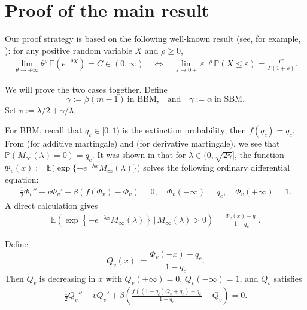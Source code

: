 \documentclass[11pt]{article}
\numberwithin{equation}{section}
\begin{document}
\section{Proof of the main result}

Our proof strategy is based on the following well-known result (see, for example, \cite[Theorem 1.7.1', p.~38]{BGT}): for any positive random variable $X$ and $\rho \geq 0$,
\begin{align}\label{Lap-small}
	\lim_{\theta \to +\infty} \theta^\rho \, \mathbb{E}(e^{-\theta X}) = C \in (0, \infty) 
	\quad \Longleftrightarrow \quad
	\lim_{\varepsilon \to 0+} \varepsilon^{-\rho} \, \mathbb{P}(X \leq \varepsilon) = \frac{C}{\Gamma(1+\rho)}.
\end{align}

We will prove the two cases together. Define
\[
\gamma:= \beta(m-1)\ \mbox{in BBM,} \quad \mbox{and}\quad 
\gamma := \alpha\ \mbox{in SBM}.
\]
Set $v := \lambda/2 + \gamma/\lambda$. 

For BBM, 
recall that $q_c \in [0,1)$ is
the extinction probability; then $f(q_c) = q_c$. From \cite[Theorem 1.2]{BK1997} (for additive martingale) and \cite[Proposition A.3(iii)]{Aidekon} (for derivative martingale), we see that $\mathbb{P}(M_\infty(\lambda) = 0) = q_c$.  
It was shown in \cite{K04}  that for $\lambda \in (0, \sqrt{2\gamma}]$, the function $\Phi_v(x) := \mathbb{E}\bigl(\exp\{-e^{-\lambda x} M_\infty(\lambda)\}\bigr)$ solves the following ordinary differential equation:
\begin{align*}
	\frac{1}{2}\Phi_v'' + v \Phi_v' + \beta(f(\Phi_v) - \Phi_v) = 0
, \quad  \Phi_v(-\infty)=q_c,\quad \Phi_v(+\infty)=1.
\end{align*}
A direct calculation gives
\begin{align}\label{Laplace-BBM}
	\mathbb{E}\left(\exp\left\{-e^{-\lambda x} M_\infty(\lambda)\right\} \,\Big|\, M_\infty(\lambda) > 0\right) = \frac{\Phi_v(x) - q_c}{1 - q_c}
	.
\end{align}

Define
\[
Q_v(x) := \frac{\Phi_v(-x) - q_c}{1 - q_c}.
\]
Then $Q_v$ is decreasing in $x$ with $Q_v(+\infty) = 0$, $Q_v(-\infty) = 1$, and $Q_v$ satisfies
\begin{align}\label{ODE2}
	\frac{1}{2} Q_v'' - v Q_v' + \beta\left( \frac{f((1 - q_c)Q_v + q_c) - q_c}{1 - q_c} - Q_v \right) = 0.
\end{align}
\end{document}
